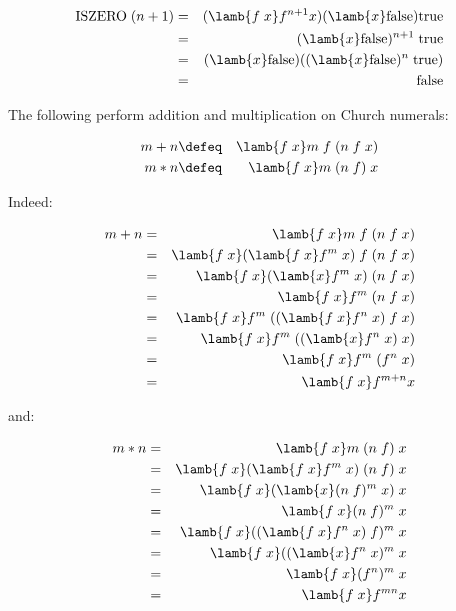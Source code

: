 \begin{eqnarray*}
\mbox{ISZERO}\; (n + 1)
  & = & (\lamb{f\; x} f^{n + 1} x) (\lamb{x} \mbox{false}) \mbox{true}  \\
  & = & (\lamb{x} \mbox{false})^{n + 1}\; \mbox{true}  \\
  & = & (\lamb{x} \mbox{false}) ((\lamb{x} \mbox{false})^n\; \mbox{true}) \\
  & = & \mbox{false}
\end{eqnarray*}

\noindent The following perform addition and multiplication on Church numerals:

\begin{eqnarray*}
 m + n & \defeq & \lamb{f\; x} m\; f\; (n\; f\; x)    \\
 m * n & \defeq & \lamb{f\; x} m\; (n\; f)\; x
\end{eqnarray*}

\noindent Indeed:

\begin{eqnarray*}
 m + n  & = & \lamb{f\; x} m\; f\; (n\; f\; x)        \\
        & = & \lamb{f\; x} (\lamb{f\; x} f^m\; x)\; f\; (n\; f\; x)     \\
        & = & \lamb{f\; x} (\lamb{x} f^m\; x)\; (n\; f\; x)     \\
        & = & \lamb{f\; x} f^m\; (n\; f\; x)                    \\
        & = & \lamb{f\; x} f^m\; ((\lamb{f\; x} f^n\; x)\; f\; x)   \\
        & = & \lamb{f\; x} f^m\; ((\lamb{x} f^n\; x)\; x)               \\
        & = & \lamb{f\; x} f^m\; (f^n\; x)                              \\
        & = & \lamb{f\; x} f^{m + n} x
\end{eqnarray*}

\noindent and:

\begin{eqnarray*}
 m * n  & = & \lamb{f\; x} m\; (n\; f)\; x                              \\
        & = & \lamb{f\; x} (\lamb{f\; x} f^m\; x)\; (n\; f)\; x         \\
        & = & \lamb{f\; x} (\lamb{x} (n\; f)^m\; x)\; x                 \\
        & = & \lamb{f\; x} (n\; f)^m\; x                                \\
        & = & \lamb{f\; x} ((\lamb{f\; x} f^n\; x)\; f)^m\; x           \\
        & = & \lamb{f\; x} ((\lamb{x} f^n\; x)^m\; x                    \\
        & = & \lamb{f\; x} (f^n)^m\; x                                  \\
        & = & \lamb{f\; x} f^{m n} x
\end{eqnarray*}

